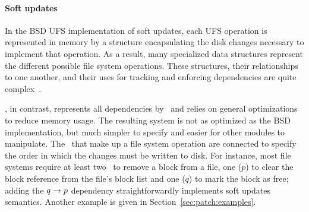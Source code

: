 
\paragraph{Soft updates}
\label{sec:using:softupdate}

\begin{comment}
%
Soft updates enforces orderings between disk writes that maintain
a ``relatively consistent'' file system state at all times, speeding
reboot by avoiding \emph{fsck}.
%
Not all invariants can be preserved, so soft updates relaxes the least
critical: a crash or sudden reboot can leak blocks or other disk
structures, but will never create inconsistencies that could lead to
metadata corruption.
%
%
%
\end{comment}
In the BSD UFS implementation of soft updates, each UFS operation is
represented in memory by a structure encapsulating the disk changes
necessary to implement that operation. As a result, many
specialized data structures represent the different possible file system
operations. These structures, their relationships to one another, and their uses
for tracking and enforcing dependencies are quite
complex~\cite{mckusick99soft}.

\Kudos, in contrast, represents all dependencies by \patches\ and relies on
general optimizations to reduce memory usage.
%
The resulting system is not as optimized as the BSD implementation, but
much simpler to specify and easier for other modules to manipulate.
%
The \patches\ that make up a file system operation are connected to specify
the order in which the changes must be written to disk.
%
For instance, most file systems require at least two \patches\ to remove
a block from a file, one ($p$) to clear the block reference from the file's
block list and one ($q$) to mark the block as free; adding the $q \rightarrow
p$ dependency straightforwardly implements soft updates semantics.
%
Another example is given in Section~\ref{sec:patch:examples}.

